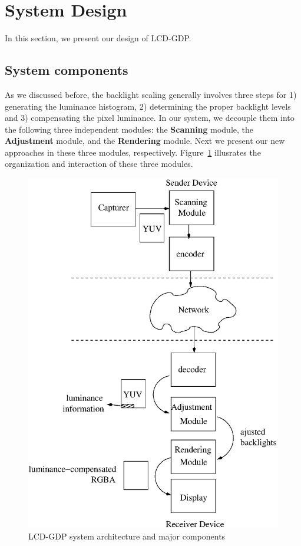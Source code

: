 \section{System Design}
\label{sec:design}
In this section, we present our design of LCD-GDP.

\subsection{System components}
As we discussed before, the backlight scaling  generally
involves three steps for 1) generating the luminance histogram, 2)
determining the proper backlight levels and 3) compensating the
pixel luminance. In our system, we decouple them into the following
three independent modules: the {\bf Scanning} module, the {\bf
 Adjustment} module, and the {\bf Rendering} module. Next we present our
new approaches in these three modules, respectively. 
Figure~\ref{fig:design} illusrates the organization and interaction of these three
modules.

\begin{figure}[t]
  \begin{center}
  \includegraphics[scale=.5]{./figures/design.eps}
  \caption{LCD-GDP system architecture and major components}
\label{fig:design}
  \end{center}
\end{figure}



